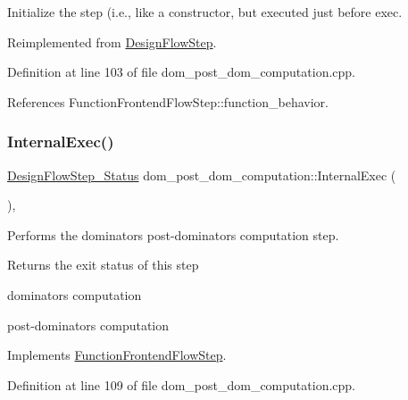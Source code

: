 Initialize the step (i.\+e., like a constructor, but executed just before exec. 



Reimplemented from \hyperlink{classDesignFlowStep_a44b50683382a094976e1d432a7784799}{Design\+Flow\+Step}.



Definition at line 103 of file dom\+\_\+post\+\_\+dom\+\_\+computation.\+cpp.



References Function\+Frontend\+Flow\+Step\+::function\+\_\+behavior.

\mbox{\label{classdom__post__dom__computation_abbbb4f87f023daa6c79cf21ff1238044}} 
\subsubsection{\texorpdfstring{Internal\+Exec()}{InternalExec()}}
{\footnotesize\ttfamily \hyperlink{design__flow__step_8hpp_afb1f0d73069c26076b8d31dbc8ebecdf}{Design\+Flow\+Step\+\_\+\+Status} dom\+\_\+post\+\_\+dom\+\_\+computation\+::\+Internal\+Exec (\begin{DoxyParamCaption}{ }\end{DoxyParamCaption})\hspace{0.3cm}{\ttfamily [override]}, {\ttfamily [virtual]}}



Performs the dominators post-\/dominators computation step. 

\begin{DoxyReturn}{Returns}
the exit status of this step 
\end{DoxyReturn}
dominators computation

post-\/dominators computation 

Implements \hyperlink{classFunctionFrontendFlowStep_a00612f7fb9eabbbc8ee7e39d34e5ac68}{Function\+Frontend\+Flow\+Step}.



Definition at line 109 of file dom\+\_\+post\+\_\+dom\+\_\+computation.\+cpp.



